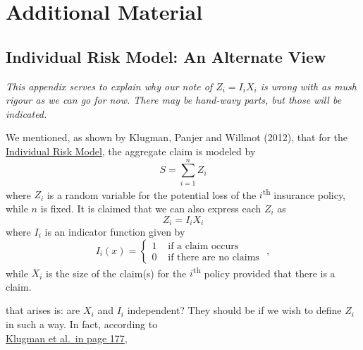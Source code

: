 \documentclass[notoc,notitlepage]{tufte-book}
\begin{document}


\appendix

\chapter{Additional Material}%
\label{chp:additional_material}

\section{Individual Risk Model: An Alternate View}%
\label{sec:individual_risk_model_an_alternate_view}

\textit{This appendix serves to explain why our note of $Z_i = I_i X_i$ is wrong with as mush rigour as we can go for now. There may be hand-wavy parts, but those will be indicated.} 

We mentioned, as shown by Klugman, Panjer and Willmot (2012)\cite{KlugmanPanjerWillmot2012}, that for the \hyperref[defn:individual_risk_model]{Individual Risk Model}, the aggregate claim is modeled by
\begin{equation*}
  S = \sum_{i=1}^{n} Z_i
\end{equation*}
where $Z_i$ is a random variable for the potential loss of the $i$\textsuperscript{th} insurance policy, while $n$ is fixed. It is claimed that we can also express each $Z_i$ as
\begin{equation*}
  Z_i = I_i X_i
\end{equation*}
where $I_i$ is an indicator function given by
\begin{equation*}
  I_i(x) = \begin{cases}
    1 & \text{ if a claim occurs } \\
    0 & \text{ if there are no claims }
  \end{cases},
\end{equation*}
while $X_i$ is the size of the claim(s) for the $i$\textsuperscript{th} policy provided that there is a claim.

 that arises is: are $X_i$ and $I_i$ independent? They should be if we wish to define $Z_i$ in such a way. In fact, according to \\
\noindent\textcolor{be-magenta}{\underline{Klugman et al.\ in page 177}},
\end{document}
